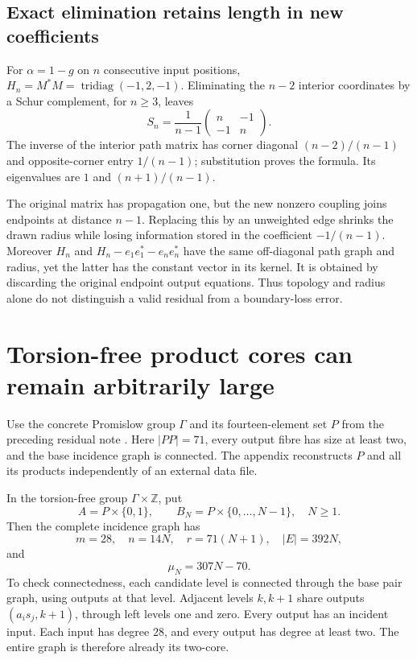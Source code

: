 \documentclass[11pt,a4paper,oneside]{report}
\theoremstyle{definition}
\theoremstyle{remark}
\newcommand{\Z}{\mathbb Z}
\begin{document}
\subsection{Exact elimination retains length in new coefficients}

For $\alpha=1-g$ on $n$ consecutive input positions,
$H_n=M^*M=\operatorname{tridiag}(-1,2,-1)$. Eliminating the
$n-2$ interior coordinates by a Schur complement, for $n\ge3$,
leaves
\begin{equation}\label{M07:eq:Schur}
\boxed{S_n=\frac1{n-1}
\begin{pmatrix}n&-1\\-1&n\end{pmatrix}.}
\end{equation}
The inverse of the interior path matrix has corner diagonal
$(n-2)/(n-1)$ and opposite-corner entry $1/(n-1)$; substitution
proves the formula. Its eigenvalues are $1$ and $(n+1)/(n-1)$.

The original matrix has propagation one, but the new nonzero
coupling joins endpoints at distance $n-1$. Replacing this by
an unweighted edge shrinks the drawn radius while losing
information stored in the coefficient $-1/(n-1)$.
Moreover $H_n$ and
$H_n-e_1e_1^*-e_ne_n^*$ have the same off-diagonal path graph
and radius, yet the latter has the constant vector in its kernel.
It is obtained by discarding the original endpoint output
equations. Thus topology and radius alone do not distinguish
a valid residual from a boundary-loss error.

\section{Torsion-free product cores can remain arbitrarily large}

Use the concrete Promislow group $\Gamma$ and its fourteen-element
set $P$ from the preceding residual note \cite{B:InternalResidual,B:CP}.
Here $|PP|=71$, every output fibre has size at least two,
and the base incidence graph is connected. The appendix
reconstructs $P$ and all its products independently of an
external data file.

In the torsion-free group $\Gamma\times\Z$, put
\[
A=P\times\{0,1\},\qquad B_N=P\times\{0,\ldots,N-1\},\quad N\ge1.
\]
Then the complete incidence graph has
\[
m=28,\quad n=14N,\quad r=71(N+1),\quad |E|=392N,
\]
and
\begin{equation}\label{M07:eq:largecore}
\boxed{\mu_N=307N-70.}
\end{equation}
To check connectedness, each candidate level is connected
through the base pair graph, using outputs at that level.
Adjacent levels $k,k+1$ share outputs $(a_i s_j,k+1)$, through
left levels one and zero. Every output has an incident input.
Each input has degree $28$, and every output has degree at least
two. The entire graph is therefore already its two-core.
\end{document}
